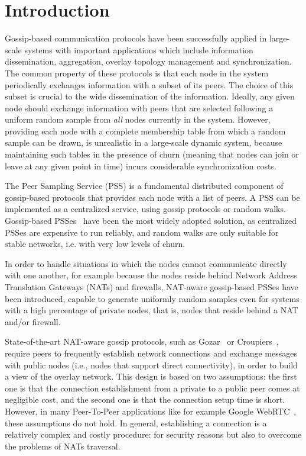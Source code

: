 
\chapter*{Introduction} %
\label{sommario}

Gossip-based communication protocols have been successfully applied in large-scale systems with important applications which include information dissemination, aggregation, overlay topology management and synchronization. The common property of these protocols is that each node in the system periodically exchanges information with a subset of its peers. The choice of this subset is crucial to the wide dissemination of the information. Ideally, any given node should exchange information with peers that are selected following a uniform random sample from \textit{all} nodes currently in the system. However, providing each node with a complete membership table from which a random sample can be drawn, is unrealistic in a large-scale dynamic system, because maintaining such tables in the presence of churn (meaning that nodes can join or leave at any given point in time) incurs considerable synchronization costs. 

The Peer Sampling Service (PSS) is a fundamental distributed component of gossip-based protocols that provides each node with a list of peers. A PSS can be implemented as a centralized service, using gossip protocols or random walks. Gossip-based PSSes~\cite{gossip_protocol} have been the most widely adopted solution, as centralized PSSes are expensive to run reliably, and random walks are only suitable for stable networks, i.e. with very low levels of churn. 

In order to handle situations in which the nodes cannot communicate directly with one another, for example because the nodes reside behind Network Address Translation Gateways (NATs) and firewalls, NAT-aware gossip-based PSSes have been introduced, capable to generate uniformly random samples even for systems with a high percentage of private nodes, that is, nodes that reside behind a NAT and/or firewall. 

State-of-the-art NAT-aware gossip protocols, such as Gozar~\cite{gozar} or Croupiers~\cite{croupier}, require peers to frequently establish network connections and exchange messages with public nodes (i.e., nodes that support direct connectivity), in order to build a view of the overlay network. This design is based on two assumptions: the first one is that the connection establishment from a private to a public peer comes at negligible cost, and the second one is that the connection setup time is short. However, in many Peer-To-Peer applications like for example Google WebRTC~\cite{webrtc}, these assumptions do not hold. In general, establishing a connection is a relatively complex and costly procedure: for security reasons but also to overcome the problems of NATs traversal. 

